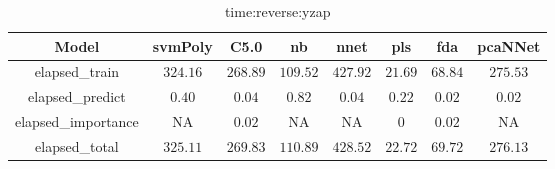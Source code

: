\begin{table}[!ht]
	\centering
	\begin{tabular}{|c|c|c|c|c|c|c|c|}
		\hline
		Model & svmPoly & C5.0 & nb & nnet & pls & fda & pcaNNet \\ \hline
		elapsed_train & $324.16$ & $268.89$ & $109.52$ & $427.92$ & $21.69$ & $68.84$ & $275.53$ \\ \hline
		elapsed_predict & $0.40$ & $0.04$ & $0.82$ & $0.04$ & $0.22$ & $0.02$ & $0.02$ \\ \hline
		elapsed_importance & NA & $0.02$ & NA & NA & $0$ & $0.02$ & NA \\ \hline
		elapsed_total & $325.11$ & $269.83$ & $110.89$ & $428.52$ & $22.72$ & $69.72$ & $276.13$ \\ \hline
	\end{tabular}
	\caption{time:reverse:yzap}
	\label{tab:time:reverse:yzap}
\end{table}
